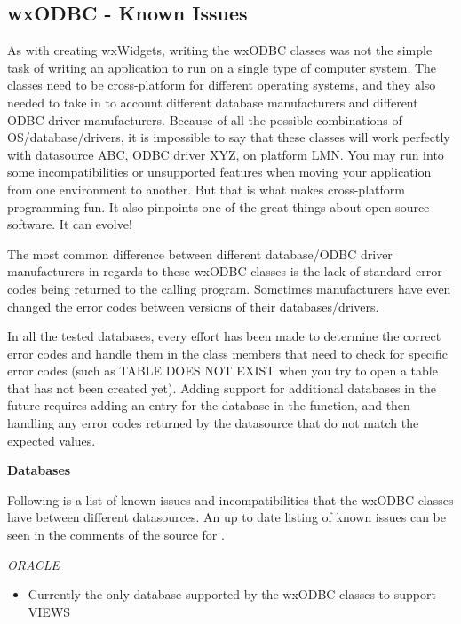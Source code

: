 
\subsection{wxODBC - Known Issues}\label{wxodbcknownissues}

As with creating wxWidgets, writing the wxODBC classes was not the simple 
task of writing an application to run on a single type of computer system. 
The classes need to be cross-platform for different operating systems, and 
they also needed to take in to account different database manufacturers and 
different ODBC driver manufacturers. Because of all the possible combinations 
of OS/database/drivers, it is impossible to say that these classes will work 
perfectly with datasource ABC, ODBC driver XYZ, on platform LMN. You may run 
into some incompatibilities or unsupported features when moving your 
application from one environment to another. But that is what makes 
cross-platform programming fun. It also pinpoints one of the great 
things about open source software. It can evolve!

The most common difference between different database/ODBC driver 
manufacturers in regards to these wxODBC classes is the lack of 
standard error codes being returned to the calling program. Sometimes 
manufacturers have even changed the error codes between versions of 
their databases/drivers. 

In all the tested databases, every effort has been made to determine 
the correct error codes and handle them in the class members that need 
to check for specific error codes (such as TABLE DOES NOT EXIST when 
you try to open a table that has not been created yet). Adding support 
for additional databases in the future requires adding an entry for the 
database in the  function, and then handling any error codes 
returned by the datasource that do not match the expected values.

{\bf Databases}

Following is a list of known issues and incompatibilities that the 
wxODBC classes have between different datasources. An up to date 
listing of known issues can be seen in the comments of the source 
for .

{\it ORACLE}
\begin{itemize}\itemsep=0pt
\item Currently the only database supported by the wxODBC classes to support VIEWS
\end{itemize}

